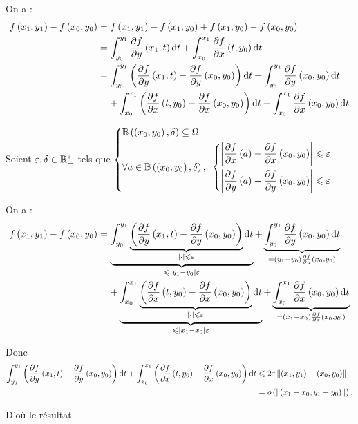 \begin{dem}
On a : \[\begin{aligned}
f\paren{x_1,y_1}-f\paren{x_0,y_0}&=f\paren{x_1,y_1}-f\paren{x_1,y_0}+f\paren{x_1,y_0}-f\paren{x_0,y_0} \\
&=\int_{y_0}^{y_1}\pdv{f}{y}\paren{x_1,t}\odif{t}+\int_{x_0}^{x_1}\pdv{f}{x}\paren{t,y_0}\odif{t} \\
&=\int_{y_0}^{y_1}\paren{\pdv{f}{y}\paren{x_1,t}-\pdv{f}{y}\paren{x_0,y_0}}\odif{t}+\int_{y_0}^{y_1}\pdv{f}{y}\paren{x_0,y_0}\odif{t} \\
&\color{white}=\color{black}+\int_{x_0}^{x_1}\paren{\pdv{f}{x}\paren{t,y_0}-\pdv{f}{x}\paren{x_0,y_0}}\odif{t}+\int_{x_0}^{x_1}\pdv{f}{x}\paren{x_0,y_0}\odif{t}
\end{aligned}\]

Soient \(\varepsilon,\delta\in\mathbb{R}_+^*\) tels que \(\begin{dcases}
\bouleo{\paren{x_0,y_0}}{\delta}\subset\Omega \\
\quantifs{\forall a\in\bouleo{\paren{x_0,y_0}}{\delta}}\begin{dcases}
\abs{\pdv{f}{x}\paren{a}-\pdv{f}{x}\paren{x_0,y_0}}\leq\epsilon \\
\abs{\pdv{f}{y}\paren{a}-\pdv{f}{y}\paren{x_0,y_0}}\leq\epsilon
\end{dcases}
\end{dcases}\)

On a : \[\begin{aligned}
f\paren{x_1,y_1}-f\paren{x_0,y_0}&=\underbrace{\int_{y_0}^{y_1}\underbrace{\paren{\pdv{f}{y}\paren{x_1,t}-\pdv{f}{y}\paren{x_0,y_0}}}_{\abs{\cdot}\leq\epsilon}\odif{t}}_{\leq\abs{y_1-y_0}\epsilon}+\underbrace{\int_{y_0}^{y_1}\pdv{f}{y}\paren{x_0,y_0}\odif{t}}_{=\paren{y_1-y_0}\pdv{f}{y}\paren{x_0,y_0}} \\
&\color{white}=\color{black}+\underbrace{\int_{x_0}^{x_1}\underbrace{\paren{\pdv{f}{x}\paren{t,y_0}-\pdv{f}{x}\paren{x_0,y_0}}}_{\abs{\cdot}\leq\epsilon}\odif{t}}_{\leq\abs{x_1-x_0}\epsilon}+\underbrace{\int_{x_0}^{x_1}\pdv{f}{x}\paren{x_0,y_0}\odif{t}}_{=\paren{x_1-x_0}\pdv{f}{x}\paren{x_0,y_0}}
\end{aligned}\]

Donc \[\begin{aligned}
\int_{y_0}^{y_1}\paren{\pdv{f}{y}\paren{x_1,t}-\pdv{f}{y}\paren{x_0,y_0}}\odif{t}+\int_{x_0}^{x_1}\paren{\pdv{f}{x}\paren{t,y_0}-\pdv{f}{x}\paren{x_0,y_0}}\odif{t}&\leq2\epsilon\norme{\paren{x_1,y_1}-\paren{x_0,y_0}} \\
&=\o{\norme{\paren{x_1-x_0,y_1-y_0}}}.
\end{aligned}\]

D'où le résultat.
\end{dem}

